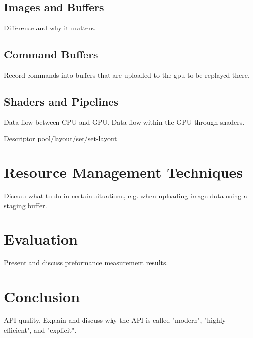 \documentclass[draft,12pt]{report}
\begin{document}
    \section{Images and Buffers}
      Difference and why it matters.

    \section{Command Buffers}
      Record commands into buffers that are uploaded to the gpu to be replayed there.

    \section{Shaders and Pipelines}
      Data flow between CPU and GPU. Data flow within the GPU through shaders.

      Descriptor pool/layout/set/set-layout


  \chapter{Resource Management Techniques}
    Discuss what to do in certain situations, e.g. when uploading image data using a staging buffer.


  \chapter{Evaluation}
    Present and discuss preformance measurement results.


  \chapter{Conclusion}
    API quality. Explain and discuss why the API is called "modern", "highly efficient", and "explicit".
\end{document}
